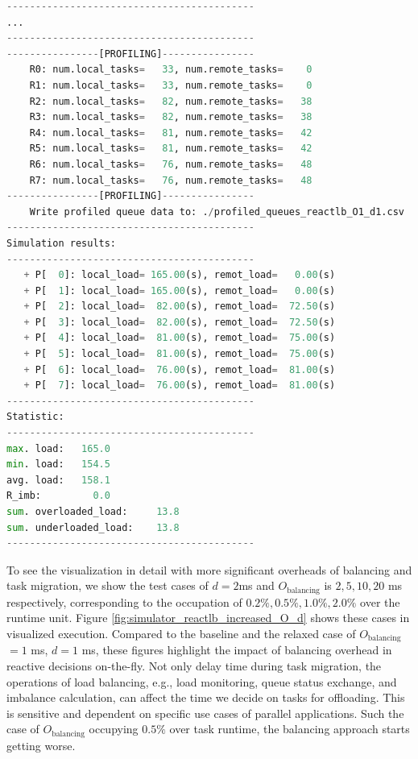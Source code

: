 \begin{lstlisting}[language=Python, caption={The simulation output of reactive load balancing case with $O_{\text{balancing}} = 1.0$ms, $d=1$ms}, label={lst:sim_output_reactlb_O1_d1}]
-------------------------------------------
...
-------------------------------------------
----------------[PROFILING]----------------
	R0: num.local_tasks=   33, num.remote_tasks=    0
	R1: num.local_tasks=   33, num.remote_tasks=    0
	R2: num.local_tasks=   82, num.remote_tasks=   38
	R3: num.local_tasks=   82, num.remote_tasks=   38
	R4: num.local_tasks=   81, num.remote_tasks=   42
	R5: num.local_tasks=   81, num.remote_tasks=   42
	R6: num.local_tasks=   76, num.remote_tasks=   48
	R7: num.local_tasks=   76, num.remote_tasks=   48
----------------[PROFILING]----------------
	Write profiled queue data to: ./profiled_queues_reactlb_O1_d1.csv
-------------------------------------------
Simulation results:
-------------------------------------------
   + P[  0]: local_load= 165.00(s), remot_load=   0.00(s)
   + P[  1]: local_load= 165.00(s), remot_load=   0.00(s)
   + P[  2]: local_load=  82.00(s), remot_load=  72.50(s)
   + P[  3]: local_load=  82.00(s), remot_load=  72.50(s)
   + P[  4]: local_load=  81.00(s), remot_load=  75.00(s)
   + P[  5]: local_load=  81.00(s), remot_load=  75.00(s)
   + P[  6]: local_load=  76.00(s), remot_load=  81.00(s)
   + P[  7]: local_load=  76.00(s), remot_load=  81.00(s)
-------------------------------------------
Statistic:
-------------------------------------------
max. load:   165.0
min. load:   154.5
avg. load:   158.1
R_imb:         0.0
sum. overloaded_load:     13.8
sum. underloaded_load:    13.8
-------------------------------------------
\end{lstlisting}
\hfill

To see the visualization in detail with more significant overheads of balancing and task migration, we show the test cases of $d=2$ms and $O_{\text{balancing}}$ is $2, 5, 10, 20$ ms respectively, corresponding to the occupation of $0.2\%, 0.5\%, 1.0\%, 2.0\%$ over the runtime unit. Figure \ref{fig:simulator_reactlb_increased_O_d} shows these cases in visualized execution. Compared to the baseline and the relaxed case of $O_{\text{balancing}}$ $=1$ ms, $d=1$ ms, these figures highlight the impact of balancing overhead in reactive decisions on-the-fly. Not only delay time during task migration, the operations of load balancing, e.g., load monitoring, queue status exchange, and imbalance calculation, can affect the time we decide on tasks for offloading. This is sensitive and dependent on specific use cases of parallel applications. Such the case of $O_{\text{balancing}}$ occupying $0.5\%$ over task runtime, the balancing approach starts getting worse.

